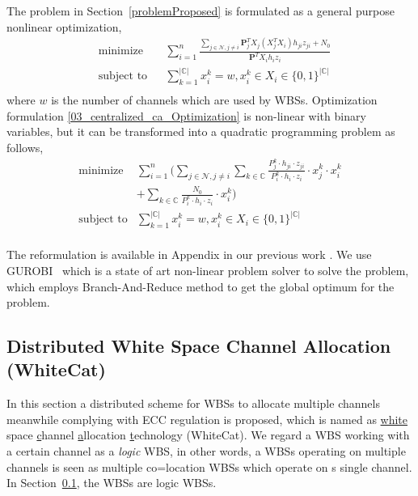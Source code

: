 \documentclass[times]{ettauth}
\theoremstyle{mytheoremstyle}
\theoremstyle{mytheoremstyle}
\theoremstyle{mytheoremstyle}
\renewcommand{\vec}[1]{\mathbf{#1}}
\begin{document}
The problem in Section~\ref{problemProposed} is formulated as a general purpose nonlinear optimization,
	\begin{equation}
\label{03_centralized_ca_Optimization}
		\begin{aligned}
		& \underset{}{\text{minimize}}
		& & \sum\limits^{n}_{i=1} \frac{\sum\limits_{j\in\mathcal{N}, j\neq i}\vec{P}_j^TX_j(X_j^TX_i)h_{ji}z_{ji} + N_0}{\vec{P}^TX_ih_iz_i}\\
		& \text{subject to}
		& & \sum\limits_{k=1}^{|\mathbb{C}|}x_i^k=w, x_i^k\in X_i\in \{0,1\}^{|\mathbb{C}|}\\
		\end{aligned}
	\end{equation}
where $w$ is the number of channels which are used by WBSs. 
Optimization formulation \ref{03_centralized_ca_Optimization} is non-linear with binary variables, but it can be transformed into a quadratic programming problem as follows,
	\begin{equation}
\label{QLP_2}
			\begin{aligned}
			\underset{}{\text{minimize}}
			& \sum\limits^{n}_{i=1} ( \sum\limits_{j\in\mathcal{N}, j\neq i}\sum\limits_{k\in\mathbb{C}} \frac{P_j^k\cdot h_{ji}\cdot z_{ji}}{P_i^k\cdot h_i\cdot z_i}\cdot  x_j^k\cdot x_i^k  \\
			& + \sum\limits_{k\in\mathbb{C}} \frac{N_0}{P_i^k\cdot h_i\cdot z_i}\cdot x_i^k)\\
			\text{subject to} 
			& \sum\limits_{k=1}^{|\mathbb{C}|}x_i^k=w, x_i^k\in X_i\in \{0,1\}^{|\mathbb{C}|}\\
			\end{aligned}
		\end{equation}

The reformulation is available in Appendix in our previous work \cite{Li2012DistributedTS}.
We use GUROBI~\cite{gurobi} which is a state of art non-linear problem solver to solve the problem, which employs Branch-And-Reduce method to get the global optimum for the problem. %



\subsection{Distributed White Space Channel Allocation (WhiteCat)}
\label{whitecat}
In this section a distributed scheme for WBSs to allocate multiple channels meanwhile complying with ECC regulation is proposed, which is named as \underline{white} space \underline{c}hannel \underline{a}llocation \underline{t}echnology (WhiteCat). 
We regard a WBS working with a certain channel as a \textit{logic} WBS, in other words, a WBSs operating on multiple channels is seen as multiple co=location WBSs which operate on s single channel. 
In Section~\ref{whitecat}, the WBSs are logic WBSs.
\end{document}
